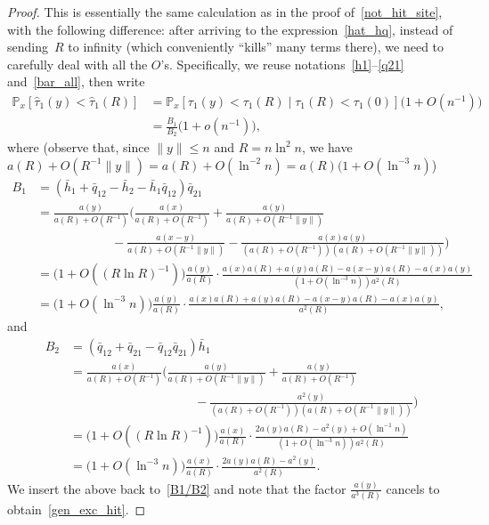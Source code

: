 \documentclass[10pt]{amsart}
\theoremstyle{definition}\newtheorem{defi}[theo]{Definition}\newtheorem{rema}[theo]{Remark}\newtheorem{exam}[theo]{Example}\newtheorem{exem}[theo]{Example}\newtheorem{nota}[theo]{Notation}
\newcommand{\1}[1]{{\mathbf 1}{\{#1\}}}
\newcommand{\8}{{\infty}}
\newcommand{\hh}{{\bar h}}
\newcommand{\hq}{{\bar q}}
\newcommand{\IP}{{\mathbb P}}
\newcommand{\htau}{\widehat{\tau}}
\begin{document}
\begin{proof}
This is essentially the same calculation as in the proof of~\eqref{not_hit_site}, with the following difference: after arriving to the expression~\eqref{hat_hq}, instead of sending~$R$ to infinity (which conveniently ``kills'' many terms there), we need to carefully deal with all the $O$'s. Specifically, we reuse notations~\eqref{h1}--\eqref{q21} and~\eqref{bar_all}, then write
\begin{align}
\IP_x[\htau_1(y)<\htau_1(R)] &= \IP_x[\tau_1(y)<\tau_1(R)\mid \tau_1(R)<\tau_1(0)]
\big(1+O(n^{-1})\big)\nonumber\\
&= \frac{B_1}{B_2}\big(1+o(n^{-1})\big),\label{B1/B2}
\end{align}
where (observe that, since $\|y\|\leq n$ and $R=n\ln^2 n$, we have $a(R)+O(R^{-1}\|y\|) =a(R)+O(\ln^{-2} n)=a(R)(1+O(\ln^{-3} n)$)
\begin{align*}
B_1 &= (\hh_1+\hq_{12}-\hh_2-\hh_1\hq_{12})\hq_{21}\\
&= \frac{a(y)}{a(R)+O(R^{-1})}
\Big(\frac{a(x)}{a(R)+O(R^{-1})}+\frac{a(y)}{a(R)+O(R^{-1}\|y\|)}\\
& \qquad \qquad \qquad -\frac{a(x-y)}{a(R)+O(R^{-1}\|y\|)} -\frac{a(x)a(y)}{(a(R)+O(R^{-1}))(a(R)+O(R^{-1}\|y\|))}\Big)\\
&= \big(1+O((R\ln R)^{-1})\big)
\frac{a(y)}{a(R)} \cdot
\frac{a(x)a(R)+a(y)a(R)-a(x-y)a(R)-a(x)a(y)}{(1+O(\ln^{-3} n))a^2(R)}\\
&= \big(1+O(\ln^{-3} n)\big)
\frac{a(y)}{a(R)} \cdot
\frac{a(x)a(R)+a(y)a(R)-a(x-y)a(R)-a(x)a(y)}{a^2(R)},
\end{align*}
and
\begin{align*}
B_2 &= (\hq_{12}+\hq_{21}-\hq_{12}\hq_{21})\hh_1\\
&= \frac{a(x)}{a(R)+O(R^{-1})}
\Big(\frac{a(y)}{a(R)+O(R^{-1}\|y\|)}+\frac{a(y)}{a(R)+O(R^{-1})}\\
& \qquad \qquad \qquad \qquad \qquad -\frac{a^2(y)}{(a(R)+O(R^{-1}))(a(R)+O(R^{-1}\|y\|))}\Big)\\
&=\big(1+O((R\ln R)^{-1})\big)
\frac{a(x)}{a(R)} \cdot
\frac{2a(y)a(R)-a^2(y)+O(\ln^{-1}n)}{(1+O(\ln^{-3} n))a^2(R)}\\
&= \big(1+O(\ln^{-3} n)\big)
\frac{a(x)}{a(R)} \cdot \frac{2a(y)a(R)-a^2(y)}{a^2(R)}.
\end{align*}
We insert the above back to~\eqref{B1/B2} and note that the factor $\frac{a(y)}{a^3(R)}$ cancels to obtain~\eqref{gen_exc_hit}.
\end{proof}
\end{document}
